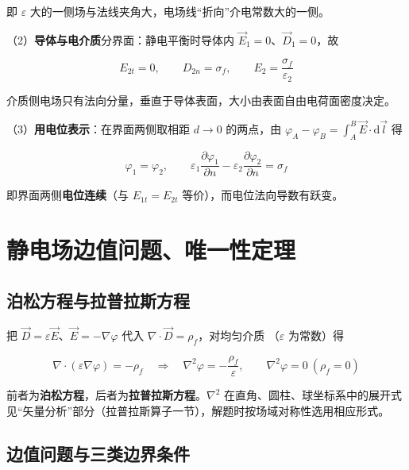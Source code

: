 即 $\varepsilon$ 大的一侧场与法线夹角大，电场线“折向”介电常数大的一侧。

（2）\textbf{导体与电介质}分界面：静电平衡时导体内 $\vec{E}_1=0$、$\vec{D}_1=0$，故
\begin{formulaBox}
\[
E_{2t}=0,\qquad D_{2n}=\sigma_f,\qquad E_2=\frac{\sigma_f}{\varepsilon_2}
\]
\end{formulaBox}

介质侧电场只有法向分量，垂直于导体表面，大小由表面自由电荷面密度决定。

（3）\textbf{用电位表示}：在界面两侧取相距 $d\to0$ 的两点，由
$\varphi_A-\varphi_B=\int_A^B\vec{E}\cdot\mathrm{d}\vec{l}$ 得
\begin{formulaBox}
\[
\varphi_1=\varphi_2,
\qquad
\varepsilon_1\frac{\partial\varphi_1}{\partial n}-\varepsilon_2\frac{\partial\varphi_2}{\partial n}=\sigma_f
\]
\end{formulaBox}

即界面两侧\textbf{电位连续}（与 $E_{1t}=E_{2t}$ 等价），而电位法向导数有跃变。


\section{静电场边值问题、唯一性定理}

\subsection{泊松方程与拉普拉斯方程}

把 $\vec{D}=\varepsilon\vec{E}$、$\vec{E}=-\nabla\varphi$ 代入 $\nabla\cdot\vec{D}=\rho_f$，对均匀介质
（$\varepsilon$ 为常数）得
\begin{formulaBox}
\[
\nabla\cdot(\varepsilon\nabla\varphi)=-\rho_f
\quad\Longrightarrow\quad
\nabla^2\varphi=-\frac{\rho_f}{\varepsilon},
\qquad
\nabla^2\varphi=0\ (\rho_f=0)
\]
\end{formulaBox}

前者为\textbf{泊松方程}，后者为\textbf{拉普拉斯方程}。$\nabla^2$ 在直角、圆柱、球坐标系中的展开式
见“矢量分析”部分（拉普拉斯算子一节），解题时按场域对称性选用相应形式。

\subsection{边值问题与三类边界条件}

